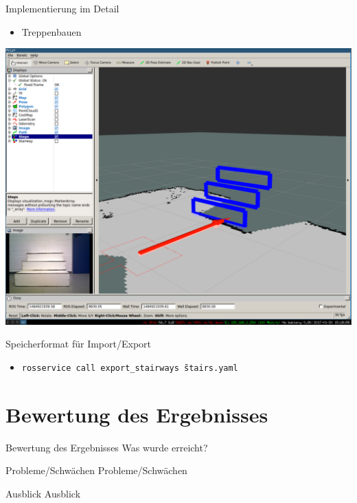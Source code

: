\documentclass[18pt]{beamer}
\begin{document}
\begin{frame}{Implementierung im Detail}
	\begin{itemize}
		\item Treppenbauen
	\end{itemize}
	\begin{center}
		\includegraphics[scale=0.16]{images/ransac03.pdf}
	\end{center}
\end{frame}

\begin{frame}{Speicherformat für Import/Export}
	\begin{itemize}
		\item \texttt{rosservice call export\_stairways \~stairs.yaml}
	\end{itemize}

\end{frame}



\section{Bewertung des Ergebnisses}

\begin{frame}{Bewertung des Ergebnisses}
Was wurde erreicht?
\end{frame}

\begin{frame}{Probleme/Schwächen}
Probleme/Schwächen
\end{frame}

\begin{frame}{Ausblick}
Ausblick
\end{frame}







\end{document}
